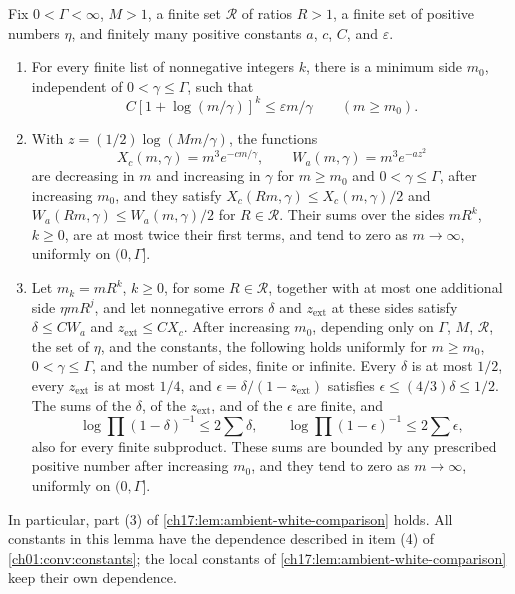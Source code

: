 \begin{lemma}\label{ch17:lem:finite-ceiling-endpoint-gates}
Fix $0<\Gamma<\infty$, $M>1$, a finite set $\mathcal R$ of ratios $R>1$, a finite set of positive numbers $\eta$, and finitely many positive constants $a$, $c$, $C$, and $\varepsilon$.
\begin{enumerate}
\item For every finite list of nonnegative integers $k$, there is a minimum side $m_0$, independent of $0<\gamma\le\Gamma$, such that
\[
 C[1+\log(m/\gamma)]^k\le\varepsilon m/\gamma\qquad(m\ge m_0).
\]
\item With $z=(1/2)\log(Mm/\gamma)$, the functions
\[
 X_c(m,\gamma)=m^3e^{-cm/\gamma},\qquad W_a(m,\gamma)=m^3e^{-az^2}
\]
are decreasing in $m$ and increasing in $\gamma$ for $m\ge m_0$ and $0<\gamma\le\Gamma$, after increasing $m_0$, and they satisfy $X_c(Rm,\gamma)\le X_c(m,\gamma)/2$ and $W_a(Rm,\gamma)\le W_a(m,\gamma)/2$ for $R\in\mathcal R$. Their sums over the sides $mR^k$, $k\ge0$, are at most twice their first terms, and tend to zero as $m\to\infty$, uniformly on $(0,\Gamma]$.
\item Let $m_k=mR^k$, $k\ge0$, for some $R\in\mathcal R$, together with at most one additional side $\eta mR^j$, and let nonnegative errors $\delta$ and $z_{\mathrm{ext}}$ at these sides satisfy $\delta\le CW_a$ and $z_{\mathrm{ext}}\le CX_c$. After increasing $m_0$, depending only on $\Gamma$, $M$, $\mathcal R$, the set of $\eta$, and the constants, the following holds uniformly for $m\ge m_0$, $0<\gamma\le\Gamma$, and the number of sides, finite or infinite. Every $\delta$ is at most $1/2$, every $z_{\mathrm{ext}}$ is at most $1/4$, and $\epsilon=\delta/(1-z_{\mathrm{ext}})$ satisfies $\epsilon\le(4/3)\delta\le1/2$. The sums of the $\delta$, of the $z_{\mathrm{ext}}$, and of the $\epsilon$ are finite, and
\[
 \log\prod(1-\delta)^{-1}\le2\sum\delta,\qquad\log\prod(1-\epsilon)^{-1}\le2\sum\epsilon,
\]
also for every finite subproduct. These sums are bounded by any prescribed positive number after increasing $m_0$, and they tend to zero as $m\to\infty$, uniformly on $(0,\Gamma]$.
\end{enumerate}
In particular, part (3) of \cref{ch17:lem:ambient-white-comparison} holds. All constants in this lemma have the dependence described in item (4) of \cref{ch01:conv:constants}; the local constants of \cref{ch17:lem:ambient-white-comparison} keep their own dependence.
\end{lemma}

